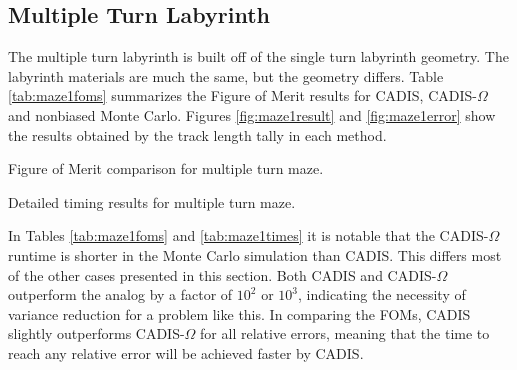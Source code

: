 \subsection{Multiple Turn Labyrinth}
\label{subsec:maze1}

The multiple turn labyrinth is built off of the single turn labyrinth geometry.
The labyrinth materials are much the same, but the geometry differs. Table
\ref{tab:maze1foms} summarizes the Figure of Merit results for CADIS,
CADIS-$\Omega$ and nonbiased Monte Carlo. Figures \ref{fig:maze1result} and
\ref{fig:maze1error} show the results obtained by the track length tally in each
method.

\begin{table}[h!]
  \centering
  
  \caption[Figure of Merit comparison for multiple turn maze.]{Figure of Merit
    comparison for multiple turn maze.}
  \label{tab:maze1foms}
\end{table}

\begin{table}[h!]
  \centering
  
  \caption[Detailed timing results for multiple turn maze.]
  {Detailed timing results for multiple turn maze.}
  \label{tab:maze1times}
\end{table}

In Tables \ref{tab:maze1foms} and \ref{tab:maze1times}
it is notable that the CADIS-$\Omega$ runtime is
shorter in the Monte Carlo simulation than CADIS. This differs most of the other
cases presented in this section. Both CADIS and CADIS-$\Omega$ outperform the
analog by a factor of $10^2$ or $10^3$, indicating the necessity of variance
reduction for a problem like this. In comparing the FOMs, CADIS slightly outperforms
CADIS-$\Omega$ for all relative errors, meaning that the time
to reach any relative error will be achieved faster by CADIS.

